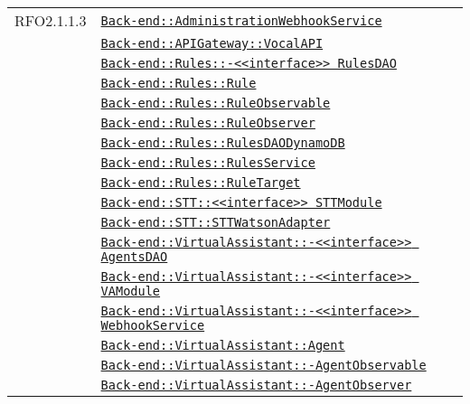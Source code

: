 \begin{longtable}{|>{\centering}m{3cm}|m{10cm}<{\centering}|}
RFO2.1.1.3 & \hyperref[Back-end::AdministrationWebhookService]{\texttt{Back-end::AdministrationWebhookService}}\\
& \hyperref[Back-end::APIGateway::VocalAPI]{\texttt{Back-end::APIGateway::VocalAPI}}\\
& \hyperref[Back-end::Rules::<<interface>> RulesDAO]{\texttt{Back-end::Rules::-\linebreak <<interface>> RulesDAO}}\\
& \hyperref[Back-end::Rules::Rule]{\texttt{Back-end::Rules::Rule}}\\
& \hyperref[Back-end::Rules::RuleObservable]{\texttt{Back-end::Rules::RuleObservable}}\\
& \hyperref[Back-end::Rules::RuleObserver]{\texttt{Back-end::Rules::RuleObserver}}\\
& \hyperref[Back-end::Rules::RulesDAODynamoDB]{\texttt{Back-end::Rules::RulesDAODynamoDB}}\\
& \hyperref[Back-end::Rules::RulesService]{\texttt{Back-end::Rules::RulesService}}\\
& \hyperref[Back-end::Rules::RuleTarget]{\texttt{Back-end::Rules::RuleTarget}}\\
& \hyperref[Back-end::STT::<<interface>> STTModule]{\texttt{Back-end::STT::<<interface>> STTModule}}\\
& \hyperref[Back-end::STT::STTWatsonAdapter]{\texttt{Back-end::STT::STTWatsonAdapter}}\\
& \hyperref[Back-end::VirtualAssistant::<<interface>> AgentsDAO]{\texttt{Back-end::VirtualAssistant::-\linebreak <<interface>> AgentsDAO}}\\
& \hyperref[Back-end::VirtualAssistant::<<interface>> VAModule]{\texttt{Back-end::VirtualAssistant::-\linebreak <<interface>> VAModule}}\\
& \hyperref[Back-end::VirtualAssistant::<<interface>> WebhookService]{\texttt{Back-end::VirtualAssistant::-\linebreak <<interface>> WebhookService}}\\
& \hyperref[Back-end::VirtualAssistant::Agent]{\texttt{Back-end::VirtualAssistant::Agent}}\\
& \hyperref[Back-end::VirtualAssistant::AgentObservable]{\texttt{Back-end::VirtualAssistant::-\linebreak AgentObservable}}\\
& \hyperref[Back-end::VirtualAssistant::AgentObserver]{\texttt{Back-end::VirtualAssistant::-\linebreak AgentObserver}}\\

\end{longtable}
